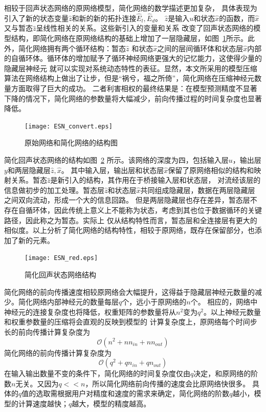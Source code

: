 相较于回声状态网络的原网络模型，简化网络的数学描述更加复杂， 具体表现为引入了新的状态变量\(\widehat{z}\)和新的新的拓扑连接\(\widehat{E}_l,\widehat{E}_d\)。
\(\widehat{z}\)是输入\(u\)和状态\(\widehat{x}\)的函数，而\(\widehat{x}\)又与暂态\(\widehat{z}\)呈线性相关的关系。这些新引入的变量和关系
改变了回声状态网络的模型结构，即简化网络在原网络结构的基础上增加了一层隐藏层，如图~\ref{fig:esn_convert}所示。此外，简化网络拥有两个循环结构：暂态\(\widehat{z}\)
和状态\(\widehat{x}\)之间的层间循环体和状态层\(\widehat{x}\)内部的自循环体。循环体的增加赋予了循环神经网络更强大的记忆能力，这使得少量的隐藏层神经元
就可以实现对系统动态特性的表征。显然，本文所采用的模型压缩算法在网络结构上做出了让步，但是“祸兮，福之所倚”，简化网络在压缩神经元数量方面取得了巨大的成功。
二者利害相权的最终结果是：在模型预测精度不显著下降的情况下，简化网络的参数量将大幅减少，前向传播过程的时间复杂度也显著降低。
\begin{figure}
	\centering
	\texttt{[image: ESN\_convert.eps]}
	\caption{原始网络和简化网络的结构图}
	\label{fig:esn_convert}
\end{figure}

简化回声状态网络的结构如图~\ref{fig:esn_red} 所示。该网络的深度为四，包括输入层\(u\)，输出层\(y\)和两层隐藏层\(\widehat{z},\widehat{x}\)。
其中输入层，输出层和状态层\(\widehat{x}\)保留了原网络相似的结构和映射关系。暂态\(\widehat{z}\)是新引入的结构，其作用在于桥接输入层和状态层，
对流经该层的信息做初步的加工处理。暂态层\(\widehat{z}\)和状态层\(\widehat{x}\)共同组成隐藏层，数据在两层隐藏层之间双向流动，形成一个大的信息回路。
但是两层隐藏层也存在差异，暂态层不存在自循环体，因此传统上意义上不能称为状态，考虑到其也位于数据循环的关键路径，因此称之为暂态。实际上
仅从结构特性而言，暂态层和全连接层有更大的相似度。以上分析了简化网络的结构特性，相较于原网络，既存在保留部分，也添加了新的元素。 

\begin{figure}
	\centering
	\texttt{[image: ESN\_red.eps]}
	\caption{简化回声状态网络结构}
	\label{fig:esn_red}
\end{figure}

简化网络的前向传播速度相较原网络会大幅提升，这得益于隐藏层神经元数量的减少。简化网络内部神经元的数量每层\(q\)个，远小于原网络的\(n\)个。
相应的，网络中神经元的连接复杂度也将降低，权重矩阵的参数量将从\(n^2\)变为\(q^2\)。以上神经元数量和权重参数量的压缩将会直观的反映到模型的
计算复杂度上，原网络每个时间步长的前向传播计算复杂度为
\begin{equation}
	\mathcal{O}(n^2 + n n_{in} + n n_{out})
\end{equation}
简化网络的前向传播计算复杂度为
\begin{equation}
	\mathcal{O}(q^2 + q n_{in} + q n_{out})
	\label{eq:computeComplexity}
\end{equation}
在输入输出数量不变的条件下，简化网络的时间复杂度仅由\(q\)决定，和原网络的阶数\(n\)无关。又因为\(q<<n\)，所以简化网络前向传播的速度会比原网络快很多。
具体的\(q\)值的选取需根据用户对精度和速度的需求来确定，简化网络的阶数\(q\)越小，模型的计算速度越快；\(q\)越大，模型的精度越高。

